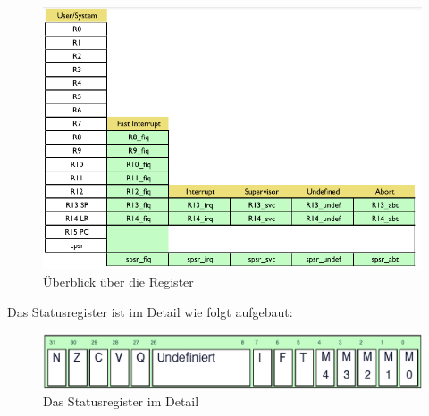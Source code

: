 \begin{figure}
\includegraphics[width=\columnwidth]{bilder/overviewRegister} 
\caption[Überblick über die Register]{Überblick über die Register \cite{arm2009}}
\label{Register}
\end{figure}

Das Statusregister ist im Detail wie folgt aufgebaut:
\begin{figure}
\includegraphics[width=\columnwidth]{bilder/statusRegister} 
\caption[Das Statusregister im Detail]{Das Statusregister im Detail \cite{arm2009}}
\label{Statusregister}
\end{figure}
 
